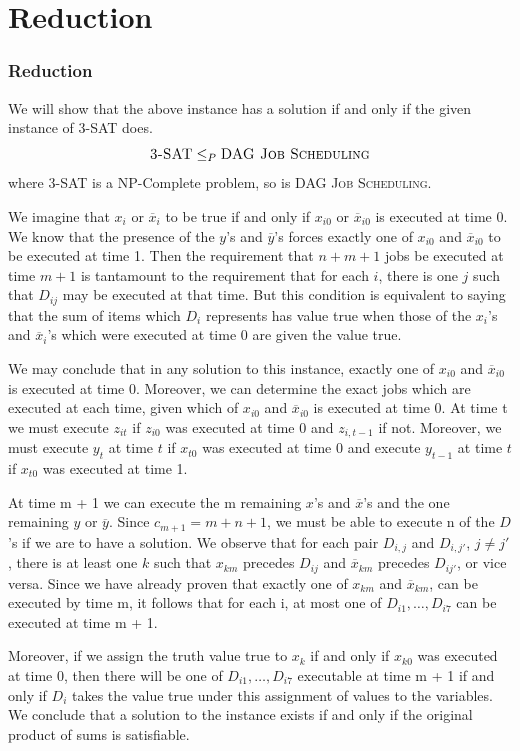 \section{Reduction}
\begin{frame}[allowframebreaks]
\frametitle{Reduction}
We will show that the above instance has a solution if and only if the given instance of \textsc{3-SAT} does. 
\begin{equation*}
    \text{\textsc{3-SAT}} \leq_P \text{\textsc{DAG Job Scheduling}}
\end{equation*}
where \textsc{3-SAT} is a NP-Complete problem, so is \textsc{DAG Job Scheduling}.
 \framebreak
 
We imagine that $x_i$ or $\overline x_i$ to be true if and only if $x_{i0}$ or $\overline x_{i0}$ is executed at time 0. We know that the presence of the $y$'s and $\overline y$'s forces exactly one of $x_{i0}$ and $\overline x_{i0}$ to be executed at time 1. Then the requirement that $n+m+1$ jobs be executed at time $m+1$ is tantamount to the requirement that for each $i$, there is one $j$ such that $D_{ij}$ may be executed at that time. But this condition is equivalent to saying that the sum of items which $D_i$ represents has value true when those of the $x_i$'s and $\overline x_i$'s which were executed at time 0 are given the value true.
\framebreak

We may conclude that in any solution to this instance, exactly one of $x_{i0}$ and $\overline x_{i0}$ is executed at time 0. Moreover, we can determine the exact jobs which are executed at each time, given which of $x_{i0}$ and $\overline x_{i0}$ is executed at time 0. At time t we must execute $z_{it}$ if $z_{i0}$ was executed at time 0 and $z_{i,t-1}$ if not. Moreover, we must execute $y_t$ at time $t$ if $x_{t0}$ was executed at time 0 and execute $y_{t-1}$ at time $t$ if $x_{t0}$ was executed at time 1.
\framebreak

At time m + 1 we can execute the m remaining $x$'s and $\overline x$'s and the one remaining $y$ or $\overline y$. Since $c_{m+1}=m+n+1$, we must be able to execute n of the $D$'s if we are to have a solution. We observe that for each pair $D_{i,j}$ and $D_{i,j'}$, $j \neq j'$, there is at least one $k$ such that $x_{km}$ precedes $D_{ij}$ and $\overline x_{km}$ precedes $D_{ij'}$, or vice versa. Since we have already proven that exactly one of $x_{km}$ and $\overline x_{km}$, can be executed by time m, it follows that for each i, at most one of $D_{i1},\ldots,D_{i7}$ can be executed at time m + 1.
\framebreak

Moreover, if we assign the truth value true to $x_k$ if and only if $x_{k0}$ was executed at time 0, then there will be one of $D_{i1},\ldots,D_{i7}$ executable at time m + 1 if and only if $D_i$ takes the value true under this assignment of values to the variables. We conclude that a solution to the instance  exists if and only if the original product of sums is satisfiable.
    
\end{frame}


